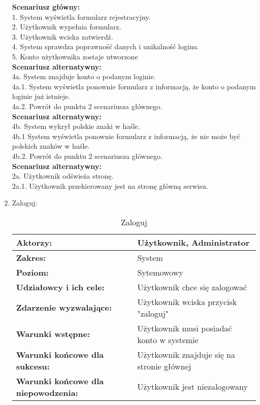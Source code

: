 \begin{enumerate}[label=(\Roman*)]
\textbf{Scenariusz główny:}\\
1. System wyświetla formularz rejestracyjny.\\
2. Użytkownik wypełnia formularz.\\
3. Użytkownik wciska zatwierdź.\\
4. System sprawdza poprawność danych i unikalność loginu.\\
5. Konto użytkownika zostaje utworzone\\
\textbf{Scenariusz alternatywny:}\\
4a. System znajduje konto o podanym loginie.\\
4a.1. System wyświetla ponownie formularz z informacją, że konto o podanym loginie już
istnieje.\\
4a.2. Powrót do punktu 2 scenariusza głównego.\\
\textbf{Scenariusz alternatywny:}\\
4b. System wykrył polskie znaki w haśle.\\
4b.1 System wyświetla ponownie formularz z informacją, że nie może być polskich znaków
w haśle.\\
4b.2. Powrót do punktu 2 scenariusza głównego.\\
\textbf{Scenariusz alternatywny:}\\
2a. Użytkownik odświeża stronę.\\
2a.1. Użytkownik przekierowany jest na stronę główną serwisu.\\

\item Zaloguj:
	\begin{table}[H]
\centering
\caption{Zaloguj}
\label{Zaloguj}
\begin{tabular}{|p{7cm}|p{7cm}|}
  \hline 
  \textbf{Aktorzy:} & Użytkownik, Administrator\\
  \hline
  \textbf{Zakres:} & System \\
	\hline
  \textbf{Poziom:} & Sytemowowy \\
	\hline
  \textbf{Udziałowcy i ich cele: } & Użytkownik chce się zalogować
 \\
	\hline
  \textbf{Zdarzenie wyzwalające: } & Użytkownik wciska przycisk "zaloguj"\\
	\hline
  \textbf{Warunki wstępne: } & Użytkownik musi posiadać konto w systemie \\
	\hline
  \textbf{Warunki końcowe dla sukcesu:} & Użytkownik znajduje się na stronie głównej\\
	\hline
  \textbf{Warunki końcowe dla niepowodzenia:} & Użytkownik jest niezalogowany \\
  \hline
\end{tabular} 
\end{table}


\end{enumerate}
